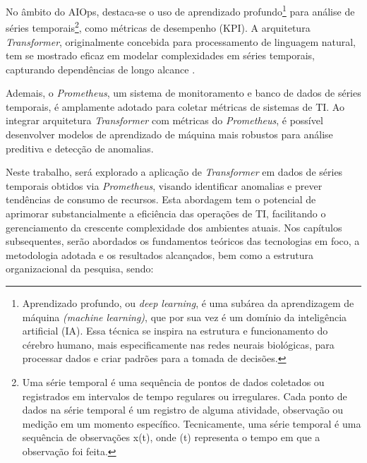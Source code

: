 No âmbito do AIOps, destaca-se o uso de aprendizado profundo\footnote{Aprendizado profundo, ou \textit{deep learning}, é uma subárea da aprendizagem de máquina \textit{(machine learning)}, que por sua vez é um domínio da inteligência artificial (IA). Essa técnica se inspira na estrutura e funcionamento do cérebro humano, mais especificamente nas redes neurais biológicas, para processar dados e criar padrões para a tomada de decisões.} para análise de séries temporais\footnote{Uma série temporal é uma sequência de pontos de dados coletados ou registrados em intervalos de tempo regulares ou irregulares. Cada ponto de dados na série temporal é um registro de alguma atividade, observação ou medição em um momento específico. Tecnicamente, uma série temporal é uma sequência de observações  x(t), onde  (t) representa o tempo em que a observação foi feita.}, como métricas de desempenho (KPI). A arquitetura \textit{Transformer}, originalmente concebida para processamento de linguagem natural, tem se mostrado eficaz em modelar complexidades em séries temporais, capturando dependências de longo alcance \cite{vaswani2017attention}.

Ademais, o \textit{Prometheus}, um sistema de monitoramento e banco de dados de séries temporais, é amplamente adotado para coletar métricas de sistemas de TI. Ao integrar arquitetura \textit{Transformer} com métricas do \textit{Prometheus}, é possível desenvolver modelos de aprendizado de máquina mais robustos para análise preditiva e detecção de anomalias.

Neste trabalho, será explorado a aplicação de \textit{Transformer} em dados de séries temporais obtidos via \textit{Prometheus}, visando identificar anomalias e prever tendências de consumo de recursos. Esta abordagem tem o potencial de aprimorar substancialmente a eficiência das operações de TI, facilitando o gerenciamento da crescente complexidade dos ambientes atuais. Nos capítulos subsequentes, serão abordados os fundamentos teóricos das tecnologias em foco, a metodologia adotada e os resultados alcançados, bem como a estrutura organizacional da pesquisa, sendo:

